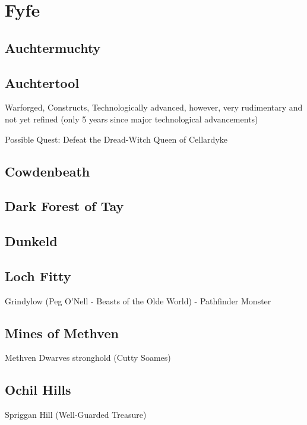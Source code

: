\chapter*{Fyfe}

\section*{Auchtermuchty}
\section*{Auchtertool}
Warforged, Constructs, Technologically advanced, however, very rudimentary and not yet refined (only 5 years since major technological advancements)

Possible Quest: Defeat the Dread-Witch Queen of Cellardyke
\section*{Cowdenbeath}
\section*{Dark Forest of Tay}
\section*{Dunkeld}
\section*{Loch Fitty}
Grindylow (Peg O'Nell - Beasts of the Olde World) - Pathfinder Monster
\section*{Mines of Methven}
Methven Dwarves stronghold (Cutty Soames)
\section*{Ochil Hills}
Spriggan Hill (Well-Guarded Treasure)
\vfill\eject
